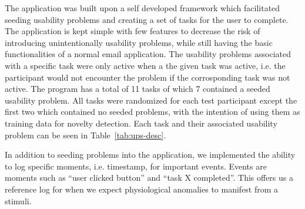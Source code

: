 The application was built upon a self developed framework which facilitated seeding usability problems and creating a set of tasks for the user to complete. 
The application is kept simple with few features to decrease the risk of introducing unintentionally usability problems, while still having the basic functionalities of a normal email application.  
The usability problems associated with a specific task were only active when a the given task was active, i.e. the participant would not encounter the problem if the corrosponding task was not active.
The program has a total of 11 tasks of which 7 contained a seeded usability problem. 
All tasks were randomized for each test participant except the first two which contained no seeded problems, with the
intention of using them as training data for novelty detection. 
Each task and their associated usability problem can be seen in Table~\ref{tab:ups-desc}.

In addition to seeding problems into the application, we implemented the ability to log specific moments, i.e. timestamp,
for important events. Events are moments such as ``user clicked button'' and ``task X completed''. This offers us a
reference log for when we expect physiological anomalies to manifest from a stimuli.


